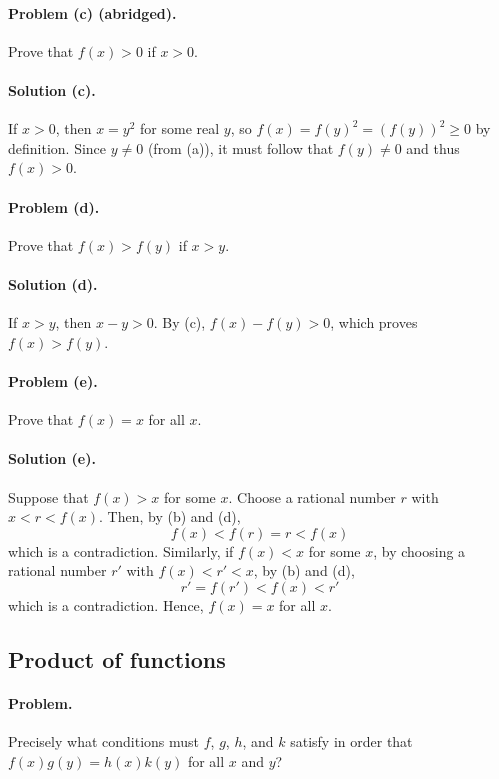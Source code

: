 \documentclass{article}
\begin{document}
\paragraph{Problem (c) (abridged).} Prove that $f(x) > 0$ if $x > 0$.

\paragraph{Solution (c).} If $x > 0$, then $x = y^2$ for some real $y$, so $f(x) = f(y)^2 = (f(y))^2 \geq 0$ by definition. Since $y \neq 0$ (from (a)), it must follow that $f(y) \neq 0$ and thus $f(x) > 0$.

\paragraph{Problem (d).} Prove that $f(x) > f(y)$ if $x > y$.

\paragraph{Solution (d).} If $x > y$, then $x - y > 0$. By (c), $f(x) - f(y) > 0$, which proves $f(x) > f(y)$.

\paragraph{Problem (e).} Prove that $f(x) = x$ for all $x$.

\paragraph{Solution (e).} Suppose that $f(x) > x$ for some $x$. Choose a rational number $r$ with $x < r < f(x)$. Then, by (b) and (d), \begin{equation*}
  f(x) < f(r) = r < f(x)
\end{equation*} which is a contradiction. Similarly, if $f(x) < x$ for some $x$, by choosing a rational number $r'$ with $f(x) < r' < x$, by (b) and (d), \begin{equation*}
  r' = f(r') < f(x) < r'
\end{equation*} which is a contradiction. Hence, $f(x) = x$ for all $x$.

\setcounter{subsection}{17}
\subsection{Product of functions}

\paragraph{Problem.} Precisely what conditions must $f$, $g$, $h$, and $k$ satisfy in order that $f(x)g(y) = h(x)k(y)$ for all $x$ and $y$?
\end{document}
